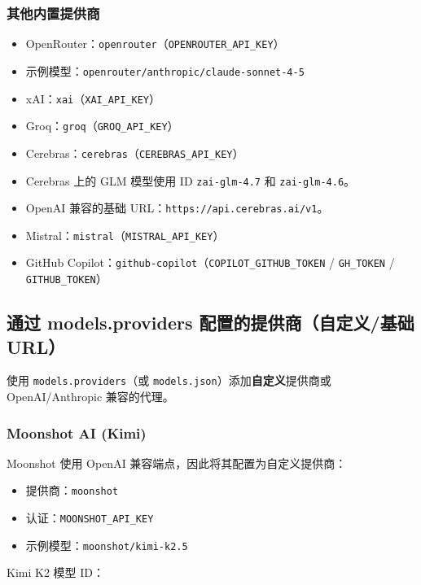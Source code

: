 \subsubsection{其他内置提供商}


\begin{itemize}
  \item OpenRouter：\texttt{openrouter}（\texttt{OPENROUTER\_API\_KEY}）
  \item 示例模型：\texttt{openrouter/anthropic/claude-sonnet-4-5}
  \item xAI：\texttt{xai}（\texttt{XAI\_API\_KEY}）
  \item Groq：\texttt{groq}（\texttt{GROQ\_API\_KEY}）
  \item Cerebras：\texttt{cerebras}（\texttt{CEREBRAS\_API\_KEY}）
  \item Cerebras 上的 GLM 模型使用 ID \texttt{zai-glm-4.7} 和 \texttt{zai-glm-4.6}。
  \item OpenAI 兼容的基础 URL：\texttt{https://api.cerebras.ai/v1}。
  \item Mistral：\texttt{mistral}（\texttt{MISTRAL\_API\_KEY}）
  \item GitHub Copilot：\texttt{github-copilot}（\texttt{COPILOT\_GITHUB\_TOKEN} / \texttt{GH\_TOKEN} / \texttt{GITHUB\_TOKEN}）
\end{itemize}


\subsection{通过 models.providers 配置的提供商（自定义/基础 URL）}


使用 \texttt{models.providers}（或 \texttt{models.json}）添加\textbf{自定义}提供商或 OpenAI/Anthropic 兼容的代理。

\subsubsection{Moonshot AI (Kimi)}


Moonshot 使用 OpenAI 兼容端点，因此将其配置为自定义提供商：

\begin{itemize}
  \item 提供商：\texttt{moonshot}
  \item 认证：\texttt{MOONSHOT\_API\_KEY}
  \item 示例模型：\texttt{moonshot/kimi-k2.5}
\end{itemize}


Kimi K2 模型 ID：

